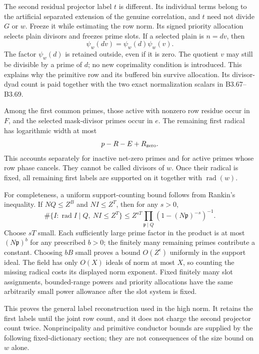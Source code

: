 The second residual projector label $t$ is different. Its individual
terms belong to the artificial separated extension of the genuine
correlation, and $t$ need not divide $G$ or $w$. Freeze it while estimating
the row norm. Its signed priority allocation selects plain divisors and
freezes prime slots. If a selected plain is $n=dv$, then
\[
 \psi_w(dv)=\psi_w(d)\psi_w(v).
\]
The factor $\psi_w(d)$ is retained outside, even if it is zero. The
quotient $v$ may still be divisible by a prime of $d$; no new coprimality
condition is introduced. This explains why the primitive row and its
buffered bin survive allocation. Its divisor-dyad count is paid together
with the two exact normalization scalars in B3.67--B3.69.

Among the first common primes, those active with nonzero row residue
occur in $F$, and the selected mask-divisor primes occur in $e$.
The remaining first radical has logarithmic width at most
\[
 p-R-E+R_{\rm zero}.
\]
This accounts separately for inactive net-zero primes and for active
primes whose row phase cancels. They cannot be called divisors of $w$.
Once their radical is fixed, all remaining first labels are supported
on it together with $\operatorname{rad}(w)$.

For completeness, a uniform support-counting bound follows from Rankin's
inequality. If $NQ\le Z^B$ and $NI\le Z^T$, then for any $s>0$,
\[
 \#\{I:\operatorname{rad}I\mid Q,\ NI\le Z^T\}
 \le Z^{sT}\prod_{\mathfrak p\mid Q}(1-(N\mathfrak p)^{-s})^{-1}.
\]
Choose $sT$ small. Each sufficiently large prime factor in the product
is at most $(N\mathfrak p)^b$ for any prescribed $b>0$; the finitely
many remaining primes contribute a constant. Choosing $bB$ small proves
a bound $O(Z^\epsilon)$ uniformly in the support ideal. The field has
only $O(X)$ ideals of norm at most $X$, so counting the missing radical
costs its displayed norm exponent. Fixed finitely many slot assignments,
bounded-range powers and priority allocations have the same arbitrarily
small power allowance after the slot system is fixed.

This proves the general label reconstruction used in the high norm.
It retains the first labels until the joint row count, and it does not
charge the second projector count twice. Nonprincipality and primitive
conductor bounds are supplied by the following fixed-dictionary section;
they are not consequences of the size bound on $w$ alone.
